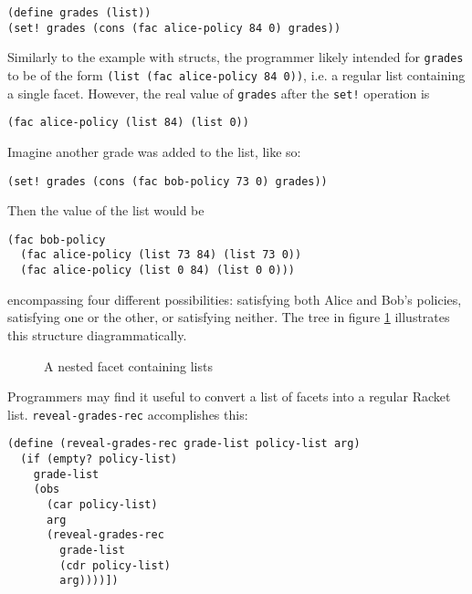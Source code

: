\documentclass{article}
\begin{document}
\begin{lstlisting}
(define grades (list))
(set! grades (cons (fac alice-policy 84 0) grades))
\end{lstlisting}

Similarly to the example with structs, the programmer likely intended for \texttt{grades} to be of the form \texttt{(list (fac alice-policy 84 0))}, i.e. a regular list containing a single facet. However, the real value of \texttt{grades} after the \texttt{set!} operation is

\begin{lstlisting}
(fac alice-policy (list 84) (list 0))
\end{lstlisting}

Imagine another grade was added to the list, like so:

\begin{lstlisting}
(set! grades (cons (fac bob-policy 73 0) grades))
\end{lstlisting}

Then the value of the list would be

\begin{lstlisting}
(fac bob-policy
  (fac alice-policy (list 73 84) (list 73 0))
  (fac alice-policy (list 0 84) (list 0 0)))
\end{lstlisting}

\noindent encompassing four different possibilities: satisfying both Alice and Bob's policies, satisfying one or the other, or satisfying neither. The tree in figure \ref{figure:nested-list} illustrates this structure diagrammatically.

\begin{figure}[h]
\begin{center}
	\caption{A nested facet containing lists}
	\label{figure:nested-list}
\end{center}
\end{figure}

Programmers may find it useful to convert a list of facets into a regular Racket list. \texttt{reveal-grades-rec} accomplishes this:

\begin{lstlisting}
(define (reveal-grades-rec grade-list policy-list arg)
  (if (empty? policy-list)
    grade-list
    (obs
      (car policy-list)
      arg
      (reveal-grades-rec
        grade-list
        (cdr policy-list)
        arg))))])
\end{lstlisting}
\end{document}
